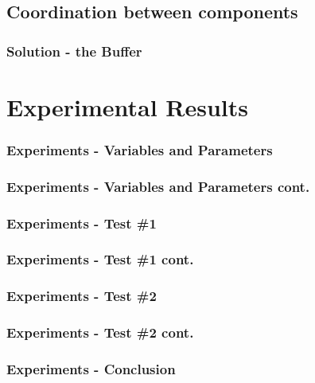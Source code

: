 \documentclass{beamer}
\begin{document}
\subsection{Coordination between components}
\begin{frame}
\frametitle{Solution - the Buffer}
\end{frame}

\section{Experimental Results}
\begin{frame}
\frametitle{Experiments - Variables and Parameters}
\end{frame}

\begin{frame}
\frametitle{Experiments - Variables and Parameters cont.}
\end{frame}

\begin{frame}
\frametitle{Experiments - Test \#1}
\end{frame}

\begin{frame}
\frametitle{Experiments - Test \#1 cont.}
\end{frame}

\begin{frame}
\frametitle{Experiments - Test \#2}
\end{frame}

\begin{frame}
\frametitle{Experiments - Test \#2 cont.}
\end{frame}

\begin{frame}
\frametitle{Experiments - Conclusion}
\end{frame}
\end{document}
